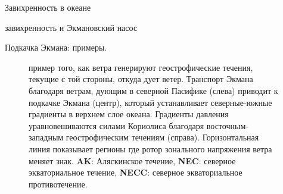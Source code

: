 \begin{chapter}{Завихренность в океане}
\begin{section}{завихренность и Экмановский насос}
\begin{paragraph}{Подкачка Экмана: примеры.}
\begin{figure}[b!]
\vspace{-3ex}
\caption{пример того, как ветра генерируют геострофические течения,
текущие с той стороны, откуда дует ветер. Транспорт Экмана благодаря
ветрам, дующим в северной Пасифике (слева) приводит к подкачке Экмана
(центр), который устанавливает северные-южные градиенты в верхнем слое
океана. Градиенты давления уравновешиваются силами Кориолиса благодаря
восточным-западным геострофическим течениям (справа). Горизонтальная
линия показывает регионы где ротор зонального напряжения ветра меняет
знак. \textbf{AK}: Аляскинское течение, \textbf{NEC}: северное
экваториальное течение, \textbf{NECC}: северное экваториальное противотечение.}
\label{fig:zonalmeanwinds}
\vfill
\end{figure}
%

\end{paragraph}
\end{section}
\end{chapter}
